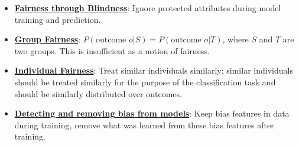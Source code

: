 \documentclass{article}%
\begin{document}
\begin{itemize}[leftmargin=*]%
\item \href{https://purdue.brightspace.com/d2l/common/assets/pdfjs-d2l-dist/1.0.14-legacy/web/viewer.html?file=%2Fcontent%2Fenforced%2F1095467-wl.202510.CS.24300.001%2F16L2-ethics.pdf%3Fou%3D1095467&lang=en-us&container=d2l-fileviewer-rendered-pdf&fullscreen=d2l-fileviewer-rendered-pdf-dialog&height=667#page=25}{\textbf{Fairness through Blindness}}: Ignore protected attributes during model training and prediction.%
\item \href{https://purdue.brightspace.com/d2l/common/assets/pdfjs-d2l-dist/1.0.14-legacy/web/viewer.html?file=%2Fcontent%2Fenforced%2F1095467-wl.202510.CS.24300.001%2F16L2-ethics.pdf%3Fou%3D1095467&lang=en-us&container=d2l-fileviewer-rendered-pdf&fullscreen=d2l-fileviewer-rendered-pdf-dialog&height=667#page=26}{\textbf{Group Fairness}}: $P(\text{outcome } o | S) = P(\text{outcome } o | T)$, where $S$ and $T$ are two groups. This is insufficient as a notion of fairness.%
\item \href{https://purdue.brightspace.com/d2l/common/assets/pdfjs-d2l-dist/1.0.14-legacy/web/viewer.html?file=%2Fcontent%2Fenforced%2F1095467-wl.202510.CS.24300.001%2F16L2-ethics.pdf%3Fou%3D1095467&lang=en-us&container=d2l-fileviewer-rendered-pdf&fullscreen=d2l-fileviewer-rendered-pdf-dialog&height=667#page=27}{\textbf{Individual Fairness}}: Treat similar individuals similarly; similar individuals should be treated similarly for the purpose of the classification task and should be similarly distributed over outcomes.%
\item \href{https://purdue.brightspace.com/d2l/common/assets/pdfjs-d2l-dist/1.0.14-legacy/web/viewer.html?file=%2Fcontent%2Fenforced%2F1095467-wl.202510.CS.24300.001%2F16L2-ethics.pdf%3Fou%3D1095467&lang=en-us&container=d2l-fileviewer-rendered-pdf&fullscreen=d2l-fileviewer-rendered-pdf-dialog&height=667#page=34}{\textbf{Detecting and removing bias from models}}: Keep bias features in data during training, remove what was learned from these bias features after training.%
\end{itemize}

%
\end{document}
